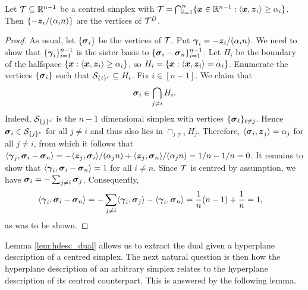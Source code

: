  
\begin{lemma}
	\label{lem:hdesc_dual}
	Let $\mathcal{T}\subseteq\mathbb{R}^{n-1}$ be a centred simplex with $\mathcal{T}=\bigcap_{i=1}^n  \{\vb*{x}\in\mathbb{R}^{n-1}: \langle \vb*{x},\vb*{z}_i\rangle \geq  \alpha_i\}$. Then $\{-\vb*{z}_i/(\alpha_i n)\}$ are the vertices of $\mathcal{T}^D$. 
\end{lemma}
\begin{proof}
	As usual, let $\{\vb*{\sigma}_i\}$ be the vertices of $\mathcal{T}$. Put $\vb*{\gamma}_i = -\vb*{z}_i/(\alpha_i n)$. We need to show that $\{\vb*{\gamma}_i\}_{i=1}^{n-1}$ is the sister basis to $\{\vb*{\sigma}_i-\vb*{\sigma}_n\}_{i=1}^{n-1}$. Let $H_i$ be the boundary of the halfspace $\{\vb*{x}:\langle \vb*{x},\vb*{z}_i\rangle \geq \alpha_i\}$, so $H_i = \{\vb*{x}:\langle \vb*{x},\vb*{z}_i\rangle = \alpha_i\}$. Enumerate the vertices $\{\vb*{\sigma}_i\}$ such that $\mathcal{S}_{\{i\}^c} \subseteq H_i$. Fix $i\in[n-1]$. We claim that 
	\[\vb*{\sigma}_i \in \bigcap_{j\neq i}H_i.\]
	Indeed, $\mathcal{S}_{\{j\}^c}$ is the $n-1$ dimensional simplex with vertices $\{\vb*{\sigma}_\ell\}_{\ell\neq j}$. Hence $\vb*{\sigma}_i\in \mathcal{S}_{\{j\}^c}$ for all $j\neq i$ and thus also lies in $\cap_{j \neq i}H_j$. Therefore, $\langle \vb*{\sigma}_i,\vb*{z}_j\rangle = \alpha_j$ for all $j\neq i$, from which it follows  that $\langle \vb*{\gamma}_j,\vb*{\sigma}_i-\vb*{\sigma}_n\rangle = -\langle \vb*{z}_j,\vb*{\sigma}_i\rangle/(\alpha_j n) + \langle \vb*{z}_j,\vb*{\sigma}_n\rangle / (\alpha_j n )=1/n - 1/n =0$.  
	It remains to show that $\langle \vb*{\gamma}_i,\vb*{\sigma}_i-\vb*{\sigma}_n\rangle=1$ for all $i\neq n$. Since $\mathcal{T}$ is centred by assumption, we have $\vb*{\sigma}_i = -\sum_{j\neq i} \vb*{\sigma}_j$. Consequently, 
	\begin{align*}
	\langle \vb*{\gamma}_i,\vb*{\sigma}_i-\vb*{\sigma}_n\rangle &= -\sum_{j\neq i}\langle \vb*{\gamma}_i,\vb*{\sigma}_j\rangle - \langle \vb*{\gamma}_i,\vb*{\sigma}_n \rangle = \frac{1}{n}(n-1) + \frac{1}{n} = 1,
	\end{align*}
	as was to be shown.  
\end{proof}

Lemma \ref{lem:hdesc_dual} allows us to extract the dual given a hyperplane description of a centred simplex. The next natural question is then how the hyperplane description of an arbitrary simplex relates to the hyperplane description of its centred counterpart. This is answered by the following lemma. 

